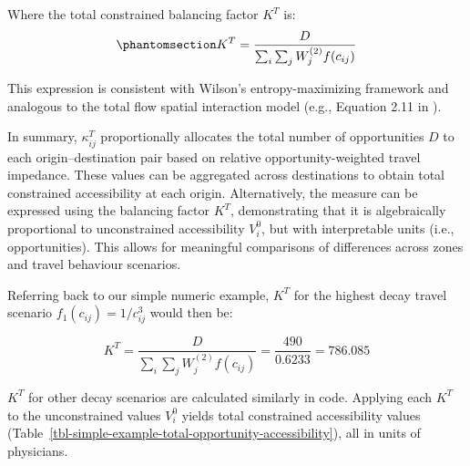 \documentclass[
  10pt,
  letterpaper,
]{article}
\begin{document}
Where the total constrained balancing factor \(K^T\) is:
\begin{equation}\phantomsection\label{eq-total-opportunity-balancing-factor}{
K^T = \frac{D}{\sum_i\sum_j W^{(2)}_jf(c_{ij})}
}\end{equation}

This expression is consistent with Wilson's entropy-maximizing framework
and analogous to the total flow spatial interaction model (e.g.,
Equation 2.11 in \citep{cliff_evaluating_1974}).

In summary, \(\kappa_{ij}^T\) proportionally allocates the total number
of opportunities \(D\) to each origin--destination pair based on
relative opportunity-weighted travel impedance. These values can be
aggregated across destinations to obtain total constrained accessibility
at each origin. Alternatively, the measure can be expressed using the
balancing factor \(K^T\), demonstrating that it is algebraically
proportional to unconstrained accessibility \(V_i^0\), but with
interpretable units (i.e., opportunities). This allows for meaningful
comparisons of differences across zones and travel behaviour scenarios.

Referring back to our simple numeric example, \(K^T\) for the highest
decay travel scenario \(f_1(c_{ij}) = 1/c_{ij}^3\) would then be:

\[
K^T = \frac{D}{\sum_{i}\sum_{j} W_j^{(2)} f(c_{ij})} = \frac{490}{0.6233} = 786.085
\]

\(K^T\) for other decay scenarios are calculated similarly in code.
Applying each \(K^T\) to the unconstrained values \(V_i^0\) yields total
constrained accessibility values
(Table~\ref{tbl-simple-example-total-opportunity-accessibility}), all in
units of physicians.
\end{document}
